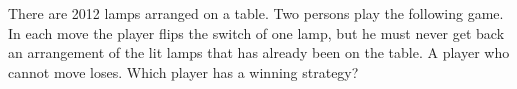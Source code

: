 There are 2012 lamps arranged on a table.  Two persons play the following game.  In each move the player flips the switch of one lamp, but he must never get back an arrangement of the lit lamps that has already been on the table.  A player who cannot move loses.  Which player has a winning strategy?